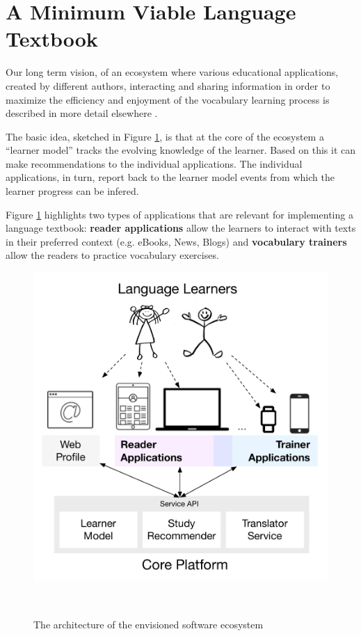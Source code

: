 
\newpage
\section{A Minimum Viable Language Textbook}
\label{sec:system}

Our long term vision, of an ecosystem where various educational applications, created by different authors, interacting and sharing information in order to maximize the efficiency and enjoyment of the vocabulary learning process is described in more detail elsewhere \cite{Lungu16}. 

The basic idea, sketched in Figure \ref{fig:architecture}, is that at the core of the ecosystem a ``learner model'' tracks the evolving knowledge of the learner. Based on this it can make recommendations to the individual applications. The individual applications, in turn, report back to the learner model events from which the learner progress can be infered. 

Figure \ref{fig:architecture} highlights two types of applications that are relevant for implementing a language textbook: {\bf reader applications} allow the learners to interact with texts in their preferred context (e.g. eBooks, News, Blogs) and {\bf vocabulary trainers} allow the readers to practice vocabulary exercises. 

\begin{figure}[h!]
\centering
  \includegraphics[width=0.8\columnwidth]{figures/zeeguu-architecture.pdf}
  \caption{The architecture of the envisioned software ecosystem}~\label{fig:architecture}
\end{figure}



